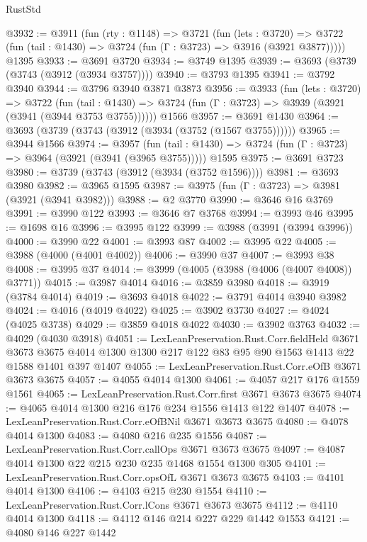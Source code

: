 \begin{lexlean}{RustStd}
\begin{coremodule}
@3932 := @3911
    (fun (rty : @1148) =>
    @3721
      (fun (lets : @3720) =>
      @3722 (fun (tail : @1430) => @3724 (fun (Γ : @3723) => @3916 (@3921 @3877)))))
    @1395
@3933 := @3691 @3720
@3934 := @3749 @1395
@3939 := @3693 (@3739 (@3743 (@3912 (@3934 @3757))))
@3940 := @3793 @1395
@3941 := @3792 @3940
@3944 := @3796 @3940 @3871 @3873
@3956 := @3933
    (fun (lets : @3720) =>
    @3722
      (fun (tail : @1430) => @3724 (fun (Γ : @3723) => @3939 (@3921 (@3941 (@3944 @3753 @3755))))))
    @1566
@3957 := @3691 @1430
@3964 := @3693 (@3739 (@3743 (@3912 (@3934 (@3752 (@1567 @3755))))))
@3965 := @3944 @1566
@3974 := @3957
    (fun (tail : @1430) => @3724 (fun (Γ : @3723) => @3964 (@3921 (@3941 (@3965 @3755)))))
    @1595
@3975 := @3691 @3723
@3980 := @3739 (@3743 (@3912 (@3934 (@3752 @1596))))
@3981 := @3693 @3980
@3982 := @3965 @1595
@3987 := @3975 (fun (Γ : @3723) => @3981 (@3921 (@3941 @3982)))
@3988 := @2 @3770
@3990 := @3646 @16 @3769
@3991 := @3990 @122
@3993 := @3646 @7 @3768
@3994 := @3993 @46
@3995 := @1698 @16
@3996 := @3995 @122
@3999 := @3988 (@3991 (@3994 @3996))
@4000 := @3990 @22
@4001 := @3993 @87
@4002 := @3995 @22
@4005 := @3988 (@4000 (@4001 @4002))
@4006 := @3990 @37
@4007 := @3993 @38
@4008 := @3995 @37
@4014 := @3999 (@4005 (@3988 (@4006 (@4007 @4008)) @3771))
@4015 := @3987 @4014
@4016 := @3859 @3980
@4018 := @3919 (@3784 @4014)
@4019 := @3693 @4018
@4022 := @3791 @4014 @3940 @3982
@4024 := @4016 (@4019 @4022)
@4025 := @3902 @3730
@4027 := @4024 (@4025 @3738)
@4029 := @3859 @4018 @4022
@4030 := @3902 @3763
@4032 := @4029 (@4030 @3918)
@4051 := LexLeanPreservation.Rust.Corr.fieldHeld
    @3671
    @3673
    @3675
    @4014
    @1300
    @1300
    @217
    @122
    @83
    @95
    @90
    @1563
    @1413
    @22
    @1588
    @1401
    @397
    @1407
@4055 := LexLeanPreservation.Rust.Corr.eOfB @3671 @3673 @3675
@4057 := @4055 @4014 @1300
@4061 := @4057 @217 @176 @1559 @1561
@4065 := LexLeanPreservation.Rust.Corr.first @3671 @3673 @3675
@4074 := @4065 @4014 @1300 @216 @176 @234 @1556 @1413 @122 @1407
@4078 := LexLeanPreservation.Rust.Corr.eOfBNil @3671 @3673 @3675
@4080 := @4078 @4014 @1300
@4083 := @4080 @216 @235 @1556
@4087 := LexLeanPreservation.Rust.Corr.callOps @3671 @3673 @3675
@4097 := @4087 @4014 @1300 @22 @215 @230 @235 @1468 @1554 @1300 @305
@4101 := LexLeanPreservation.Rust.Corr.opsOfL @3671 @3673 @3675
@4103 := @4101 @4014 @1300
@4106 := @4103 @215 @230 @1554
@4110 := LexLeanPreservation.Rust.Corr.lCons @3671 @3673 @3675
@4112 := @4110 @4014 @1300
@4118 := @4112 @146 @214 @227 @229 @1442 @1553
@4121 := @4080 @146 @227 @1442

\end{coremodule}
\end{lexlean}
